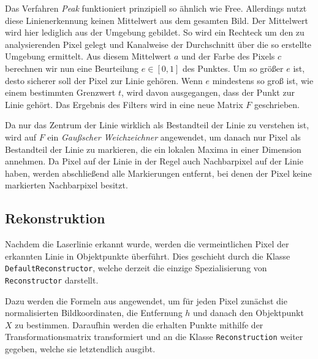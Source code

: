 \documentclass[ngerman,a4paper,parskip=half]{scrartcl}
\begin{document}
Das Verfahren \emph{Peak} funktioniert prinzipiell so ähnlich wie Free. Allerdings nutzt diese Linienerkennung keinen Mittelwert aus dem gesamten Bild. Der Mittelwert wird hier lediglich aus der Umgebung gebildet. So wird ein Rechteck um den zu analysierenden Pixel gelegt und Kanalweise der Durchschnitt über die so erstellte Umgebung ermittelt. Aus diesem Mittelwert $a$ und der Farbe des Pixels $c$ berechnen wir nun eine Beurteilung $e \in [0, 1]$ des Punktes. Um so größer $e$ ist, desto sicherer soll der Pixel zur Linie gehören. Wenn $e$ mindestens so groß ist, wie einem bestimmten Grenzwert $t$, wird davon ausgegangen, dass der Punkt zur Linie gehört. Das Ergebnis des Filters wird in eine neue Matrix $F$ geschrieben.

Da nur das Zentrum der Linie wirklich als Bestandteil der Linie zu verstehen ist, wird auf $F$ ein \emph{Gaußscher Weichzeichner} angewendet, um danach nur Pixel als Bestandteil der Linie zu markieren, die ein lokalen Maxima in einer Dimension annehmen. Da Pixel auf der Linie in der Regel auch Nachbarpixel auf der Linie haben, werden abschließend alle Markierungen entfernt, bei denen der Pixel keine markierten Nachbarpixel besitzt.

\subsection{Rekonstruktion}

Nachdem die Laserlinie erkannt wurde, werden die vermeintlichen Pixel der erkannten Linie in Objektpunkte überführt. Dies geschieht durch die Klasse \texttt{DefaultReconstructor}, welche derzeit die einzige Spezialisierung von \texttt{Reconstructor} darstellt.

Dazu werden die Formeln aus  angewendet, um für jeden Pixel zunächst die normalisierten Bildkoordinaten, die Entfernung $h$ und danach den Objektpunkt $X$ zu bestimmen. Daraufhin werden die erhalten Punkte mithilfe der Transformationsmatrix transformiert und an die Klasse \texttt{Reconstruction} weiter gegeben, welche sie letztendlich ausgibt.
	
\end{document}
